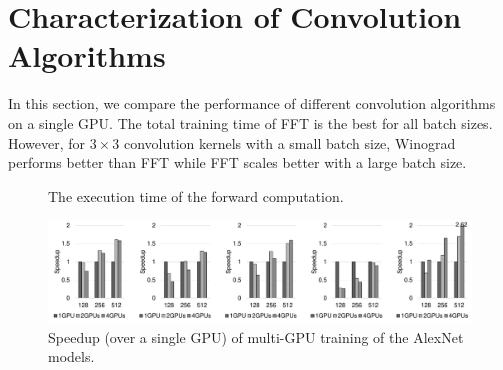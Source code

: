 

\section{Characterization of Convolution Algorithms}

In this section, we compare the performance of different convolution algorithms on a single GPU. The total training time of \textsf{FFT} is the best for all batch sizes. However, for $3 \times 3$ convolution kernels with a small batch size, \textsf{Winograd} performs better than \textsf{FFT} while \textsf{FFT} scales better with a large batch size. 

\begin{figure}[htbp]
  \centering



  \caption{The execution time of the forward computation.}
  \label{fig_layerwise}
\end{figure}

\begin{figure}[htbp]
  \centering
  \includegraphics[width=.8\linewidth]{./figures/MG}
  \subfloat[Caffe]{\makebox[.19\linewidth][]{}}
  \subfloat[Torch]{\makebox[.19\linewidth][]{}}
  \subfloat[TensorFlow]{\makebox[.18\linewidth][]{}}
  \subfloat[CNTK]{\makebox[.18\linewidth][]{}}
\caption{Speedup (over a single GPU) of multi-GPU training of the AlexNet models.}
\label{fig_mg}
\end{figure}

